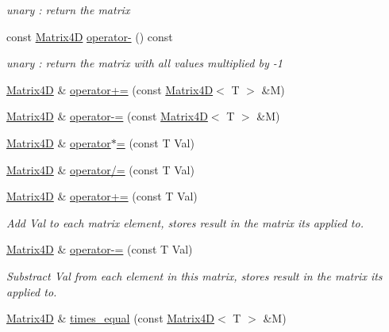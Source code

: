 \begin{DoxyCompactItemize}
\begin{DoxyCompactList}\small\item\em unary \+: return the matrix \end{DoxyCompactList}\item 
\hypertarget{class_matrix4_d_a9a77a931a7fa94e64bf070c6224e90c6}{}const \hyperlink{class_matrix4_d}{Matrix4\+D} \hyperlink{class_matrix4_d_a9a77a931a7fa94e64bf070c6224e90c6}{operator-\/} () const \label{class_matrix4_d_a9a77a931a7fa94e64bf070c6224e90c6}

\begin{DoxyCompactList}\small\item\em unary \+: return the matrix with all values multiplied by -\/1 \end{DoxyCompactList}\item 
\hyperlink{class_matrix4_d}{Matrix4\+D} \& \hyperlink{class_matrix4_d_ae8ea629894c325c30e0c0d1d7fc6eb4b}{operator+=} (const \hyperlink{class_matrix4_d}{Matrix4\+D}$<$ T $>$ \&M)
\item 
\hyperlink{class_matrix4_d}{Matrix4\+D} \& \hyperlink{class_matrix4_d_ae7002affc7094edd7f49e503b7971c35}{operator-\/=} (const \hyperlink{class_matrix4_d}{Matrix4\+D}$<$ T $>$ \&M)
\item 
\hyperlink{class_matrix4_d}{Matrix4\+D} \& \hyperlink{class_matrix4_d_adac0ec50c9d9734496b67557e6457b57}{operator$\ast$=} (const T Val)
\item 
\hyperlink{class_matrix4_d}{Matrix4\+D} \& \hyperlink{class_matrix4_d_a9255aaa3e5ad20e1ffbd0f6720309014}{operator/=} (const T Val)
\item 
\hyperlink{class_matrix4_d}{Matrix4\+D} \& \hyperlink{class_matrix4_d_adda7723310f22158d13de9ce6a901f14}{operator+=} (const T Val)
\begin{DoxyCompactList}\small\item\em Add Val to each matrix element, stores result in the matrix it\textquotesingle{}s applied to. \end{DoxyCompactList}\item 
\hyperlink{class_matrix4_d}{Matrix4\+D} \& \hyperlink{class_matrix4_d_a610cc82cf688bbead1054438f927adde}{operator-\/=} (const T Val)
\begin{DoxyCompactList}\small\item\em Substract Val from each element in this matrix, stores result in the matrix it\textquotesingle{}s applied to. \end{DoxyCompactList}\item 
\hyperlink{class_matrix4_d}{Matrix4\+D} \& \hyperlink{class_matrix4_d_af9524d248b05e422177487de44d44547}{times\+\_\+equal} (const \hyperlink{class_matrix4_d}{Matrix4\+D}$<$ T $>$ \&M)

\end{DoxyCompactItemize}
